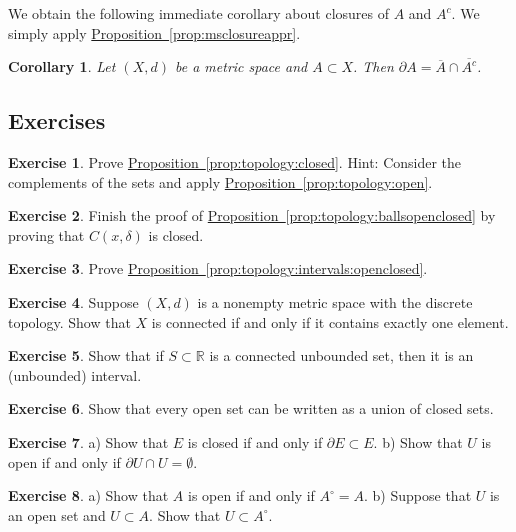 \documentclass[12pt]{book}
\newcommand{\R}{{\mathbb{R}}}
\theoremstyle{plain}
\newtheorem{cor}[thm]{Corollary}
\theoremstyle{remark}
\theoremstyle{definition}
\theoremstyle{exercise}
\newtheorem{exercise}{Exercise}[section]
\theoremstyle{example}
\newcommand{\propref}[1]{\hyperref[#1]{Proposition~\ref*{#1}}}
\begin{document}
We obtain the following immediate corollary about closures of $A$ and $A^c$.  We
simply apply \propref{prop:msclosureappr}.

\begin{cor}
Let $(X,d)$ be a metric space and $A \subset X$.
Then $\partial A = \overline{A} \cap \overline{A^c}$.
\end{cor}

\subsection{Exercises}

\begin{exercise}
Prove \propref{prop:topology:closed}.  Hint: Consider the complements of the
sets and apply \propref{prop:topology:open}.
\end{exercise}

\begin{exercise}
Finish the proof of \propref{prop:topology:ballsopenclosed} by
proving that $C(x,\delta)$ is closed.
\end{exercise}

\begin{exercise}
Prove \propref{prop:topology:intervals:openclosed}.
\end{exercise}

\begin{exercise}
Suppose $(X,d)$ is a nonempty metric space with the discrete topology.  Show
that $X$ is connected if and only if it contains exactly one element.
\end{exercise}

\begin{exercise}
Show that if $S \subset \R$ is a connected unbounded set, then it is an
(unbounded) interval.
\end{exercise}

\begin{exercise}
Show that every open set can be written as a union of closed sets.
\end{exercise}

\begin{exercise}
a) Show that $E$ is closed if and only if $\partial E \subset E$.
b) Show that $U$ is open if and only if $\partial U \cap U = \emptyset$.
\end{exercise}

\begin{exercise}
a) Show that $A$ is open if and only if $A^\circ = A$.
b) Suppose that $U$ is an open set and $U \subset A$.  Show
that $U \subset A^\circ$.
\end{exercise}
\end{document}
